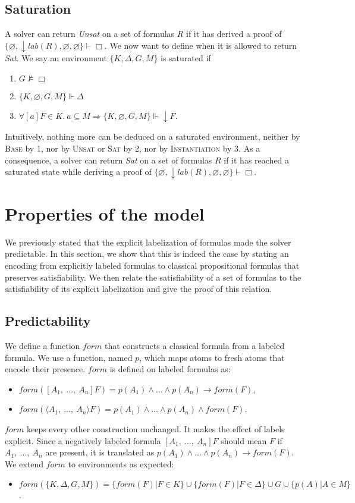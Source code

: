 \documentclass[a4paper,11pt]{article}
\newcommand{\F}{\mathit{form}}
\newcommand{\T}{\mathit{lab}}
\begin{document}
\subsection{Saturation}
A solver can return \emph{Unsat} on a set of formulas $R$ if it has derived a proof of
$\{\varnothing,\downarrow\T(R),\varnothing,\varnothing\}\vdash\Box$. We now want to define when
it is allowed to return \emph{Sat}. We say an environment $\{K,\Delta,G,M\}$ is saturated if
\begin{enumerate}
 \item $G\nvDash\Box$
 \item $\{K,\varnothing,G,M\}\Vdash\Delta$
 \item $\forall [a]F\in K.\ a\subseteq M\Rightarrow \{K,\varnothing,G,M\}\Vdash\downarrow F$.
\end{enumerate}
Intuitively, nothing more can be deduced on a saturated environment, neither by \textsc{Base}
by 1, nor by \textsc{Unsat} or \textsc{Sat} by 2, nor by \textsc{Instantiation} by 3.
As a consequence, a solver can return \emph{Sat} on a set of formulas $R$ if it has reached
a saturated state while deriving a proof of
$\{\varnothing,\downarrow\T(R),\varnothing,\varnothing\}\vdash\Box$.
\section{Properties of the model}
We previously stated that the explicit labelization of formulas made the solver predictable.
In this section, we show that this is indeed the case by stating an encoding from
explicitly labeled formulas to classical propositional formulas that preserves satisfiability.
We then relate the satisfiability of a set of formulas to the satisfiability of
its explicit labelization and give the proof of this relation.
\subsection{Predictability}
We define a function $\F$ that constructs a classical formula from a labeled formula. We use
a function, named $p$, which maps atoms to fresh atoms that encode their presence. $\F$ is
defined on labeled formulas as:
\begin{itemize}
 \item $\F([A_1,\ \dots,\ A_n]F)=p(A_1)\wedge\dots\wedge p(A_n)\rightarrow \F(F)$,
 \item $\F(\langle A_1,\ \dots,\ A_n\rangle F)= p(A_1)\wedge\dots\wedge p(A_n)\wedge \F(F)$.
\end{itemize}
$\F$ keeps every other construction unchanged. It makes the effect of labels explicit. Since a
negatively labeled formula $[A_1,\ \dots,\ A_n]F$ should mean $F$ if $A_1,\ \dots,\ A_n$ are
present, it is translated as $p(A_1)\wedge\dots\wedge p(A_n)\rightarrow \F(F)$. We extend
$\F$ to environments as expected:
\begin{itemize}
 \item $\F(\{K,\Delta,G,M\})=\{\F(F)|F\in K\}\cup\{\F(F)|F\in\Delta\}\cup G\cup\{p(A)|A\in M\}$.
\end{itemize}
\end{document}
